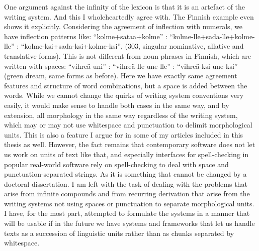 \documentclass[officiallayout,final]{unihelcompling}
\begin{document}
One argument against the infinity of the lexicon is that it is an artefact of
the writing system. And this I wholeheartedly agree with. The Finnish
example even shows it explicitly. Considering the agreement of inflection with
numerals, we have inflection patterns like: ``kolme+sataa+kolme'' :
``kolme-lle+sada-lle+kolme-lle'' : ``kolme-ksi+sada-ksi+kolme-ksi'', (303,
singular nominative, allative and translative forms). This is not different
from noun phrases in Finnish, which are written with spaces: ``vihreä uni'' :
``vihreä-lle une-lle'' : ``vihreä-ksi une-ksi'' (green dream, same forms as
before). Here we have exactly same agreement features and structure of word
combinations, but a space is added between the words.  While we cannot change
the quirks of writing system conventions very easily, it would make sense to
handle both cases in the same way, and by extension, all morphology in the same
way regardless of the writing system, which may or may not use whitespace and
punctuation to delimit morphological units.  This is also a feature I argue for
in some of my articles included in this thesis as well.  However, the fact
remains that contemporary software does not let us work on units of text like
that, and especially interfaces for spell-checking in popular real-world
software rely on spell-checking to deal with space and punctuation-separated
strings. As it is something that cannot be changed by a doctoral dissertation.
I am left with the task of dealing with the problems that arise from
infinite compounds and from recurring derivation that arise from the writing
systems not using spaces or punctuation to separate morphological units. I
have, for the most part, attempted to formulate the systems in a manner that
will be usable if in the future we have systems and frameworks that let us
handle texts as a succession of linguistic units rather than as chunks
separated by whitespace.
\end{document}
